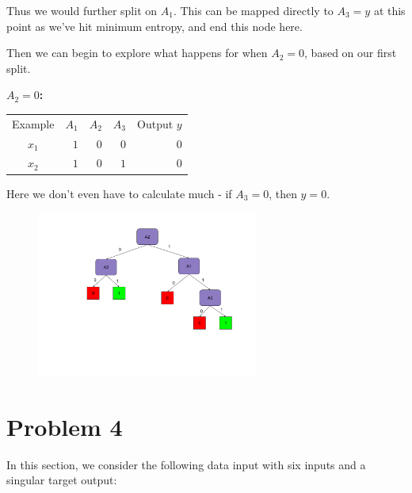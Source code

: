 \documentclass{article}
\begin{document}
Thus we would further split on $A_1$. This can be mapped directly to $A_3=y$ at this point as we've hit minimum entropy, and end this node here.

Then we can begin to explore what happens for when $A_2=0$, based on our first split.

\noindent \textbf{$A_2=0$:}

\begin{center}
    \begin{tabular}{ c r r r r }
        Example & $A_1$ & $A_2$ & $A_3$ & Output $y$\\ 
        $x_1$ & $1$ & $0$ & $0$ & $0$\\
        $x_2$ & $1$ & $0$ & $1$ & $0$\\
    \end{tabular}
\end{center}

Here we don't even have to calculate much - if $A_3=0$, then $y=0$.


\begin{figure}[H]
    \centering
    \includegraphics[width = 0.65\textwidth]{problem3b.png}
\end{figure}


\section*{Problem 4}

In this section, we consider the following data input with six inputs and a singular target output:
\end{document}
